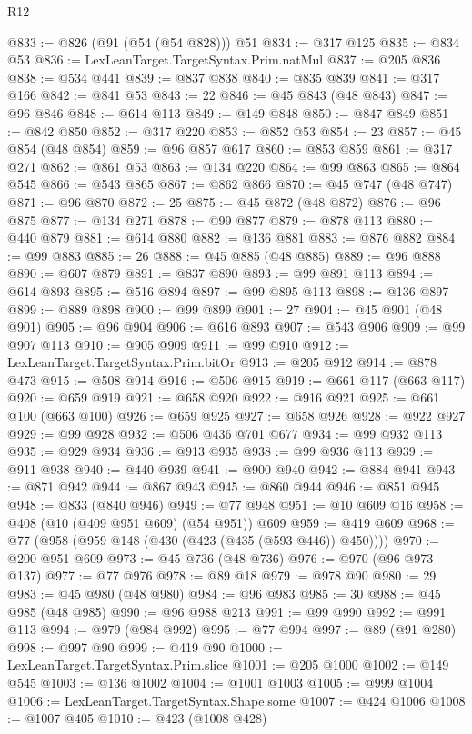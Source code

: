 \begin{lexlean}{R12}
\begin{coremodule}
{{{{{{{{{{{{{{{{{{{{{{{{{{{{{{{{{{{{{{{{{{{{{{{{{{{{{{{{{{{{{{{{{{{{{{{{{{{{{{{{{{{{{{{{{{{{{{{{{{{{{{{{{{@833 := @826 (@91 (@54 (@54 @828))) @51
@834 := @317 @125
@835 := @834 @53
@836 := LexLeanTarget.TargetSyntax.Prim.natMul
@837 := @205 @836
@838 := @534 @441
@839 := @837 @838
@840 := @835 @839
@841 := @317 @166
@842 := @841 @53
@843 := 22
@846 := @45 @843 (@48 @843)
@847 := @96 @846
@848 := @614 @113
@849 := @149 @848
@850 := @847 @849
@851 := @842 @850
@852 := @317 @220
@853 := @852 @53
@854 := 23
@857 := @45 @854 (@48 @854)
@859 := @96 @857 @617
@860 := @853 @859
@861 := @317 @271
@862 := @861 @53
@863 := @134 @220
@864 := @99 @863
@865 := @864 @545
@866 := @543 @865
@867 := @862 @866
@870 := @45 @747 (@48 @747)
@871 := @96 @870
@872 := 25
@875 := @45 @872 (@48 @872)
@876 := @96 @875
@877 := @134 @271
@878 := @99 @877
@879 := @878 @113
@880 := @440 @879
@881 := @614 @880
@882 := @136 @881
@883 := @876 @882
@884 := @99 @883
@885 := 26
@888 := @45 @885 (@48 @885)
@889 := @96 @888
@890 := @607 @879
@891 := @837 @890
@893 := @99 @891 @113
@894 := @614 @893
@895 := @516 @894
@897 := @99 @895 @113
@898 := @136 @897
@899 := @889 @898
@900 := @99 @899
@901 := 27
@904 := @45 @901 (@48 @901)
@905 := @96 @904
@906 := @616 @893
@907 := @543 @906
@909 := @99 @907 @113
@910 := @905 @909
@911 := @99 @910
@912 := LexLeanTarget.TargetSyntax.Prim.bitOr
@913 := @205 @912
@914 := @878 @473
@915 := @508 @914
@916 := @506 @915
@919 := @661 @117 (@663 @117)
@920 := @659 @919
@921 := @658 @920
@922 := @916 @921
@925 := @661 @100 (@663 @100)
@926 := @659 @925
@927 := @658 @926
@928 := @922 @927
@929 := @99 @928
@932 := @506 @436 @701 @677
@934 := @99 @932 @113
@935 := @929 @934
@936 := @913 @935
@938 := @99 @936 @113
@939 := @911 @938
@940 := @440 @939
@941 := @900 @940
@942 := @884 @941
@943 := @871 @942
@944 := @867 @943
@945 := @860 @944
@946 := @851 @945
@948 := @833 (@840 @946)
@949 := @77 @948
@951 := @10 @609 @16
@958 := @408 (@10 (@409 @951 @609) (@54 @951)) @609
@959 := @419 @609
@968 := @77 (@958 (@959 @148 (@430 (@423 (@435 (@593 @446)) @450))))
@970 := @200 @951 @609
@973 := @45 @736 (@48 @736)
@976 := @970 (@96 @973 @137)
@977 := @77 @976
@978 := @89 @18
@979 := @978 @90
@980 := 29
@983 := @45 @980 (@48 @980)
@984 := @96 @983
@985 := 30
@988 := @45 @985 (@48 @985)
@990 := @96 @988 @213
@991 := @99 @990
@992 := @991 @113
@994 := @979 (@984 @992)
@995 := @77 @994
@997 := @89 (@91 @280)
@998 := @997 @90
@999 := @419 @90
@1000 := LexLeanTarget.TargetSyntax.Prim.slice
@1001 := @205 @1000
@1002 := @149 @545
@1003 := @136 @1002
@1004 := @1001 @1003
@1005 := @999 @1004
@1006 := LexLeanTarget.TargetSyntax.Shape.some
@1007 := @424 @1006
@1008 := @1007 @405
@1010 := @423 (@1008 @428)
}}}}}}}}}}}}}}}}}}}}}}}}}}}}}}}}}}}}}}}}}}}}}}}}}}}}}}}}}}}}}}}}}}}}}}}}}}}}}}}}}}}}}}}}}}}}}}}}}}}}}}}}}}
\end{coremodule}
\end{lexlean}

